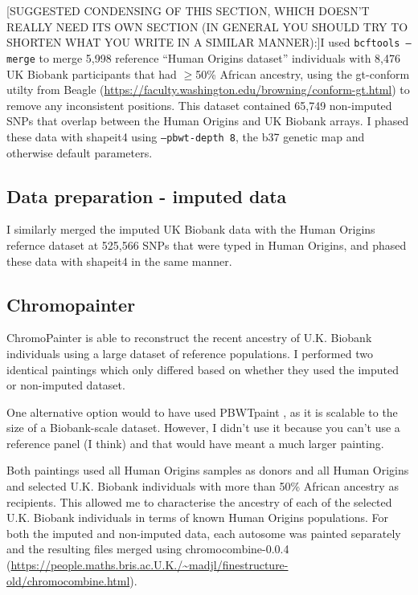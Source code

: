 {\color{red}[SUGGESTED CONDENSING OF THIS SECTION, WHICH DOESN'T REALLY NEED ITS OWN SECTION (IN GENERAL YOU SHOULD TRY TO SHORTEN WHAT YOU WRITE IN A SIMILAR MANNER):]I used \texttt{bcftools --merge} to merge 5,998 reference ``Human Origins dataset'' individuals with 8,476 UK Biobank participants that had $\geq$50\% African ancestry, using the gt-conform utilty from Beagle (\url{https://faculty.washington.edu/browning/conform-gt.html}) to remove any inconsistent positions. This dataset contained 65,749 non-imputed SNPs that overlap between the Human Origins and UK Biobank arrays. I phased these data with shapeit4 \cite{delaneau2018integrative} using \texttt{--pbwt-depth 8}, the b37 genetic map and otherwise default parameters.}


\subsection{Data preparation - imputed data}

I similarly merged the imputed UK Biobank data with the Human Origins refernce dataset at 525,566 SNPs that were typed in Human Origins, and phased these data with shapeit4 in the same manner.


\subsection{Chromopainter}

ChromoPainter is able to reconstruct the recent ancestry of U.K. Biobank individuals using a large dataset of reference populations. I performed two identical paintings which only differed based on whether they used the imputed or non-imputed dataset.

One alternative option would to have used PBWTpaint , as it is scalable to the size of a Biobank-scale dataset. However, I didn't use it because you can't use a reference panel (I think) and that would have meant a much larger painting. 

Both paintings used all Human Origins samples as donors and all Human Origins and selected U.K. Biobank individuals with more than 50\% African ancestry as recipients. This allowed me to characterise the ancestry of each of the selected U.K. Biobank individuals in terms of known Human Origins populations. For both the imputed and non-imputed data, each autosome was painted separately and the resulting files merged using chromocombine-0.0.4 (\url{https://people.maths.bris.ac.U.K./~madjl/finestructure-old/chromocombine.html}).

